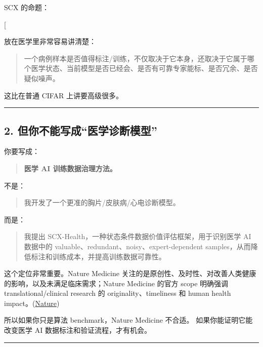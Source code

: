 \documentclass[
  12pt,
]{ctexart}
\begin{document}
SCX 的命题：

{[} \text{Data value is state-conditioned and expert-dependent.}{]}

放在医学里非常容易讲清楚：

\begin{quote}
一个病例样本是否值得标注/训练，不仅取决于它本身，还取决于它属于哪个医学状态、当前模型是否已经会、是否有可靠专家能标、是否冗余、是否疑似噪声。
\end{quote}

这比在普通 CIFAR 上讲要高级很多。

\begin{center}\rule{0.5\linewidth}{0.5pt}\end{center}

\subsection{2.
但你不能写成``医学诊断模型''}\label{ux4f46ux4f60ux4e0dux80fdux5199ux6210ux533bux5b66ux8bcaux65adux6a21ux578b}

你要写成：

\begin{quote}
\textbf{医学 AI 训练数据治理方法。}
\end{quote}

不是：

\begin{quote}
我开发了一个更准的胸片/皮肤病/心电诊断模型。
\end{quote}

而是：

\begin{quote}
我提出 SCX-Health，一种状态条件数据价值评估框架，用于识别医学 AI
数据中的 valuable、redundant、noisy、expert-dependent
samples，从而降低标注和训练成本，并提高训练数据可靠性。
\end{quote}

这个定位非常重要。Nature Medicine
关注的是原创性、及时性、对改善人类健康的影响，以及未满足临床需求；Nature
Medicine 的官方 scope 明确强调 translational/clinical research 的
originality、timeliness 和 human health
impact。(\href{https://arxiv.org/html/2406.17557v1?utm_source=chatgpt.com}{Nature})

所以如果你只是算法 benchmark，Nature Medicine 不合适。
如果你能证明它能改变医学 AI 数据标注和验证流程，才有机会。

\begin{center}\rule{0.5\linewidth}{0.5pt}\end{center}
\end{document}
